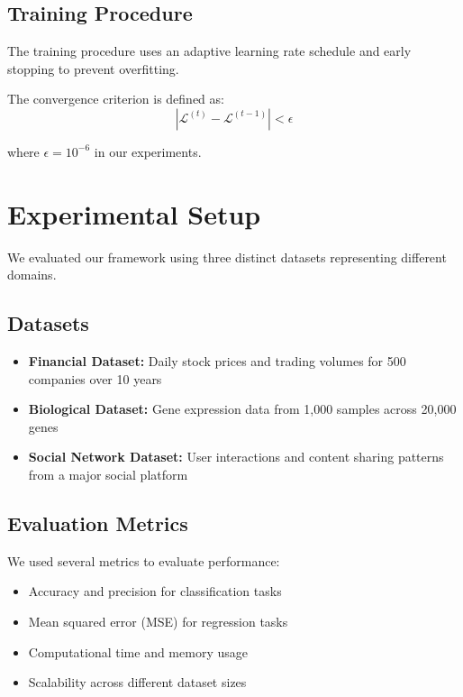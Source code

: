 \documentclass[12pt, letterpaper, onecolumn, final]{article}
\theoremstyle{plain}
\theoremstyle{definition}
\theoremstyle{remark}
\begin{document}
\lipsum[27]

\subsection{Training Procedure}
\label{sec:training}

\lipsum[28-29] The training procedure uses an adaptive learning rate schedule and early stopping to prevent overfitting.

The convergence criterion is defined as:
\begin{equation}
    |\mathcal{L}^{(t)} - \mathcal{L}^{(t-1)}| < \epsilon
    \label{eq:convergence}
\end{equation}

where $\epsilon = 10^{-6}$ in our experiments.

\section{Experimental Setup}
\label{sec:experiments}

\lipsum[30] We evaluated our framework using three distinct datasets representing different domains.

\subsection{Datasets}
\label{sec:datasets}

\lipsum[31]

\begin{itemize}
    \item \textbf{Financial Dataset:} Daily stock prices and trading volumes for 500 companies over 10 years
    \item \textbf{Biological Dataset:} Gene expression data from 1,000 samples across 20,000 genes
    \item \textbf{Social Network Dataset:} User interactions and content sharing patterns from a major social platform
\end{itemize}

\lipsum[32]

\subsection{Evaluation Metrics}
\label{sec:metrics}

\lipsum[33] We used several metrics to evaluate performance:

\begin{itemize}
    \item Accuracy and precision for classification tasks
    \item Mean squared error (MSE) for regression tasks
    \item Computational time and memory usage
    \item Scalability across different dataset sizes
\end{itemize}
\end{document}
